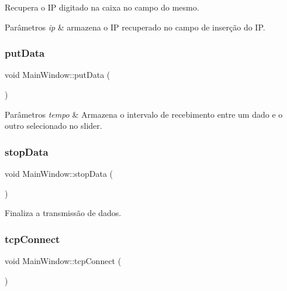 Recupera o IP digitado na caixa no campo do mesmo.


\begin{DoxyParams}{Parâmetros}
{\em ip} & armazena o IP recuperado no campo de inserção do IP.\\
\hline
\end{DoxyParams}
\mbox{\label{class_main_window_afdfeb13ec363b0eb8ecacaf0aa13b605}} 
\subsubsection{\texorpdfstring{put\+Data}{putData}}
{\footnotesize\ttfamily void Main\+Window\+::put\+Data (\begin{DoxyParamCaption}{ }\end{DoxyParamCaption})\hspace{0.3cm}{\ttfamily [slot]}}


\begin{DoxyParams}{Parâmetros}
{\em tempo} & Armazena o intervalo de recebimento entre um dado e o outro selecionado no slider.\\
\hline
\end{DoxyParams}
\mbox{\label{class_main_window_a79fdaf1fd769f0584f50da34e415b3de}} 
\subsubsection{\texorpdfstring{stop\+Data}{stopData}}
{\footnotesize\ttfamily void Main\+Window\+::stop\+Data (\begin{DoxyParamCaption}{ }\end{DoxyParamCaption})\hspace{0.3cm}{\ttfamily [slot]}}

Finaliza a transmissão de dados.\mbox{\label{class_main_window_ac5b669957c442b6eb68573dacfce33e1}} 
\subsubsection{\texorpdfstring{tcp\+Connect}{tcpConnect}}
{\footnotesize\ttfamily void Main\+Window\+::tcp\+Connect (\begin{DoxyParamCaption}{ }\end{DoxyParamCaption})\hspace{0.3cm}{\ttfamily [slot]}}

